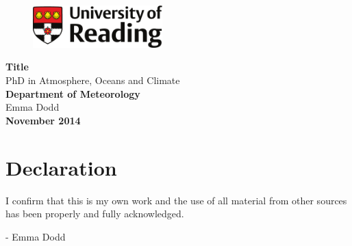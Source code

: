 \begin{titlepage}
\begin{flushright}
\begin{figure}[h]
\begin{flushright}
  \vspace{-2cm}
\includegraphics[width=50mm]{preface/figures/reading_logo.pdf} %
\end{flushright}
\end{figure}
\end{flushright}
\begin{flushleft}
  \vspace{4cm}
\Huge{\bf{Title}}\\ %
\huge{PhD in Atmosphere, Oceans and Climate} \\ %
\Large{\bf{Department of Meteorology}}\\ 
\vspace{2cm}
\huge{Emma Dodd} \\ %
\Large{\bf{November 2014}}\\ %
\end{flushleft}
\end{titlepage}

\thispagestyle{empty}


\vspace{40mm}
\chapter*{\centering \Large \vspace{-20mm}\Huge Declaration}
\thispagestyle{headings}

\par I confirm that this is my own work and the use of all material from other sources has been properly and fully acknowledged.

\vspace*{2cm}
- Emma Dodd %

\newpage
\thispagestyle{empty}

